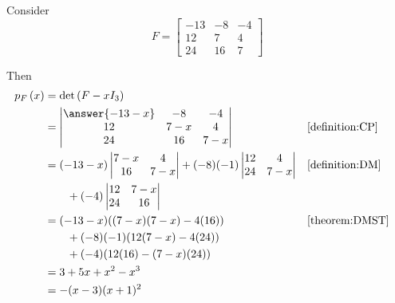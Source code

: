 \documentclass{ximera}
\begin{document}
\begin{example}
  Consider
  \[
    F=
    \begin{bmatrix}
      -13 & -8 & -4\\
      12 & 7 & 4\\
      24 & 16 & 7
    \end{bmatrix}
  \]

  Then
  \begin{align*}
    \charpoly{F}{x}&=\detname{F-xI_3}\\
                   &=
                     \begin{vmatrix}
                       \answer{-13-x} & -8 & -4\\
                       12 & 7-x & 4\\
                       24 & 16 & 7-x
                     \end{vmatrix}&&\ref{definition:CP}\\
                   &=
                     (-13-x)
                     \begin{vmatrix}
                       7-x & 4\\
                       16 & 7-x
                     \end{vmatrix}
                            +(-8)(-1)
                            \begin{vmatrix}
                              12  & 4\\
                              24  & 7-x
                            \end{vmatrix}&&\ref{definition:DM}\\
                   &\quad\quad
                     +(-4)
                     \begin{vmatrix}
                       12 & 7-x\\
                       24 & 16
                     \end{vmatrix}\\
                   &=(-13-x)((7-x)(7-x)-4(16))&&\ref{theorem:DMST}\\
                   &\quad\quad +(-8)(-1)(12(7-x)-4(24))\\
                   &\quad\quad +(-4)(12(16)-(7-x)(24))\\
                   &=3+5x+x^2-x^3\\
                   &=-(x-3)(x+1)^2
  \end{align*}
\end{example}
\end{document}
